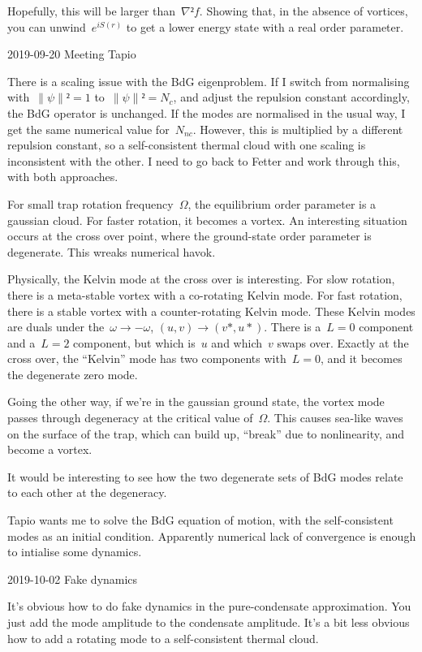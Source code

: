 Hopefully, this will be larger than~$∇²f$.  Showing that, in the absence of vortices, you can unwind~$e^{iS(r)}$ to get a lower energy state with a real order parameter.

2019-09-20 Meeting Tapio

There is a scaling issue with the BdG eigenproblem.  If I switch from normalising with~$∥ψ∥²=1$ to~$∥ψ∥²=N_c$, and adjust the repulsion constant accordingly, the BdG operator is unchanged.  If the modes are normalised in the usual way, I get the same numerical value for~$N_{nc}$.  However, this is multiplied by a different repulsion constant, so a self-consistent thermal cloud with one scaling is inconsistent with the other.  I need to go back to Fetter and work through this, with both approaches.

For small trap rotation frequency~$Ω$, the equilibrium order parameter is a gaussian cloud.  For faster rotation, it becomes a vortex.  An interesting situation occurs at the cross over point, where the ground-state order parameter is degenerate.  This wreaks numerical havok.

Physically, the Kelvin mode at the cross over is interesting.  For slow rotation, there is a meta-stable vortex with a co-rotating Kelvin mode.  For fast rotation, there is a stable vortex with a counter-rotating Kelvin mode.  These Kelvin modes are duals under the~$ω→-ω$, $(u,v)→(v*,u*)$.  There is a~$L=0$ component and a~$L=2$ component, but which is~$u$ and which~$v$ swaps over.  Exactly at the cross over, the “Kelvin” mode has two components with~$L=0$, and it becomes the degenerate zero mode.

Going the other way, if we're in the gaussian ground state, the vortex mode passes through degeneracy at the critical value of~$Ω$.  This causes sea-like waves on the surface of the trap, which can build up, “break” due to nonlinearity, and become a vortex.

It would be interesting to see how the two degenerate sets of BdG modes relate to each other at the degeneracy.

Tapio wants me to solve the BdG equation of motion, with the self-consistent modes as an initial condition.  Apparently numerical lack of convergence is enough to intialise some dynamics.

2019-10-02 Fake dynamics

It's obvious how to do fake dynamics in the pure-condensate approximation.  You just add the mode amplitude to the condensate amplitude.  It's a bit less obvious how to add a rotating mode to a self-consistent thermal cloud.

